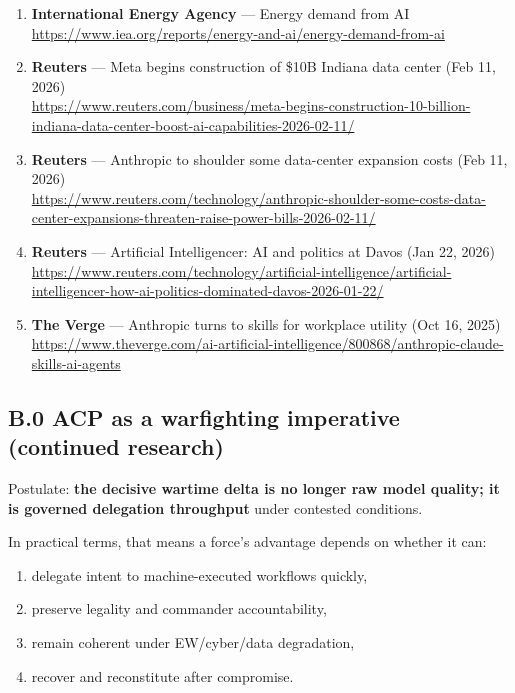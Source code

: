 \documentclass[
]{article}
\providecommand{\tightlist}{%
  \setlength{\itemsep}{0pt}\setlength{\parskip}{0pt}}
\begin{document}
\begin{enumerate}
  \url{https://www.reuters.com/technology/spacex-nvidia-deals-showing-ai-runs-capital-2026-02-06/}
\item
  \textbf{International Energy Agency} --- Energy demand from AI\\
  \url{https://www.iea.org/reports/energy-and-ai/energy-demand-from-ai}
\item
  \textbf{Reuters} --- Meta begins construction of \$10B Indiana data
  center (Feb 11, 2026)\\
  \url{https://www.reuters.com/business/meta-begins-construction-10-billion-indiana-data-center-boost-ai-capabilities-2026-02-11/}
\item
  \textbf{Reuters} --- Anthropic to shoulder some data-center expansion
  costs (Feb 11, 2026)\\
  \url{https://www.reuters.com/technology/anthropic-shoulder-some-costs-data-center-expansions-threaten-raise-power-bills-2026-02-11/}
\item
  \textbf{Reuters} --- Artificial Intelligencer: AI and politics at
  Davos (Jan 22, 2026)\\
  \url{https://www.reuters.com/technology/artificial-intelligence/artificial-intelligencer-how-ai-politics-dominated-davos-2026-01-22/}
\item
  \textbf{The Verge} --- Anthropic turns to skills for workplace utility
  (Oct 16, 2025)\\
  \url{https://www.theverge.com/ai-artificial-intelligence/800868/anthropic-claude-skills-ai-agents}
\end{enumerate}

\hypertarget{b.0-acp-as-a-warfighting-imperative-continued-research}{%
\subsection{B.0 ACP as a warfighting imperative (continued
research)}\label{b.0-acp-as-a-warfighting-imperative-continued-research}}

Postulate: \textbf{the decisive wartime delta is no longer raw model
quality; it is governed delegation throughput} under contested
conditions.

In practical terms, that means a force's advantage depends on whether it
can:

\begin{enumerate}
\def\labelenumi{\arabic{enumi}.}
\tightlist
\item
  delegate intent to machine-executed workflows quickly,
\item
  preserve legality and commander accountability,
\item
  remain coherent under EW/cyber/data degradation,
\item
  recover and reconstitute after compromise.
\end{enumerate}
\end{document}
